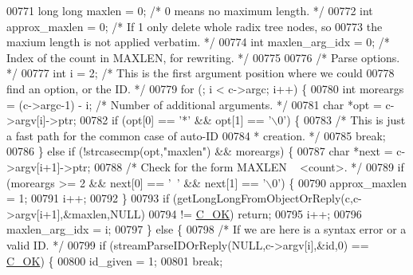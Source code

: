 \begin{DoxyCode}
{{00771     \textcolor{keywordtype}{long} \textcolor{keywordtype}{long} maxlen = 0;   \textcolor{comment}{/* 0 means no maximum length. */}
00772     \textcolor{keywordtype}{int} approx\_maxlen = 0;  \textcolor{comment}{/* If 1 only delete whole radix tree nodes, so}
00773 \textcolor{comment}{                               the maxium length is not applied verbatim. */}
00774     \textcolor{keywordtype}{int} maxlen\_arg\_idx = 0; \textcolor{comment}{/* Index of the count in MAXLEN, for rewriting. */}
00775 
00776     \textcolor{comment}{/* Parse options. */}
00777     \textcolor{keywordtype}{int} i = 2; \textcolor{comment}{/* This is the first argument position where we could}
00778 \textcolor{comment}{                  find an option, or the ID. */}
00779     \textcolor{keywordflow}{for} (; i < c->argc; i++) \{
00780         \textcolor{keywordtype}{int} moreargs = (c->argc-1) - i; \textcolor{comment}{/* Number of additional arguments. */}
00781         \textcolor{keywordtype}{char} *opt = c->argv[i]->ptr;
00782         \textcolor{keywordflow}{if} (opt[0] == \textcolor{stringliteral}{'*'} && opt[1] == \textcolor{stringliteral}{'\(\backslash\)0'}) \{
00783             \textcolor{comment}{/* This is just a fast path for the common case of auto-ID}
00784 \textcolor{comment}{             * creation. */}
00785             \textcolor{keywordflow}{break};
00786         \} \textcolor{keywordflow}{else} \textcolor{keywordflow}{if} (!strcasecmp(opt,\textcolor{stringliteral}{"maxlen"}) && moreargs) \{
00787             \textcolor{keywordtype}{char} *next = c->argv[i+1]->ptr;
00788             \textcolor{comment}{/* Check for the form MAXLEN ~ <count>. */}
00789             \textcolor{keywordflow}{if} (moreargs >= 2 && next[0] == \textcolor{stringliteral}{'~'} && next[1] == \textcolor{stringliteral}{'\(\backslash\)0'}) \{
00790                 approx\_maxlen = 1;
00791                 i++;
00792             \}
00793             \textcolor{keywordflow}{if} (getLongLongFromObjectOrReply(c,c->argv[i+1],&maxlen,NULL)
00794                 != \hyperlink{server_8h_a303769ef1065076e68731584e758d3e1}{C\_OK}) \textcolor{keywordflow}{return};
00795             i++;
00796             maxlen\_arg\_idx = i;
00797         \} \textcolor{keywordflow}{else} \{
00798             \textcolor{comment}{/* If we are here is a syntax error or a valid ID. */}
00799             \textcolor{keywordflow}{if} (streamParseIDOrReply(NULL,c->argv[i],&id,0) == \hyperlink{server_8h_a303769ef1065076e68731584e758d3e1}{C\_OK}) \{
00800                 id\_given = 1;
00801                 \textcolor{keywordflow}{break};
}}
\end{DoxyCode}
